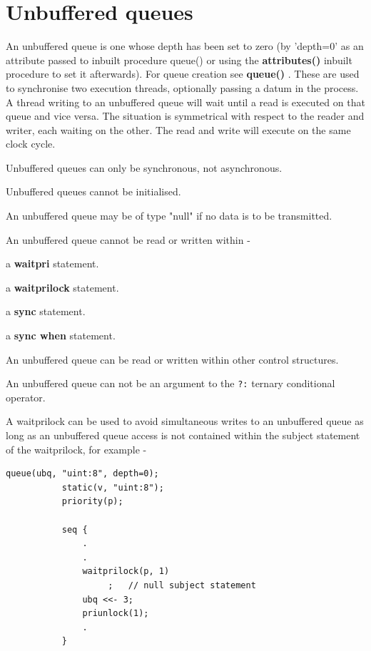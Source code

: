     \section{Unbuffered queues}\label{sec:unbufferedqueues}
     
        An unbuffered queue is one whose depth has been set to zero (by 'depth=0'
        as an attribute passed to inbuilt procedure queue() or using the {\bf
        attributes()}  inbuilt procedure to set it
        afterwards). For queue creation see {\bf queue()}
        . These are used to synchronise two execution
        threads, optionally passing a datum in the process. A thread writing to
        an unbuffered queue will wait until a read is executed on that queue and
        vice versa. The situation is symmetrical with respect to the reader and
        writer, each waiting on the other. The read and write will execute on the
        same clock cycle.
        
        Unbuffered queues can only be synchronous, not asynchronous.
        
        Unbuffered queues cannot be initialised.
        
        An unbuffered queue may be of type "null" if no data is to be transmitted.

        An unbuffered queue cannot be read or written within -
        \blist
        \item   a {\bf waitpri} statement.
        \item   a {\bf waitprilock} statement.
        \item   a {\bf sync} statement.
        \item   a {\bf sync when} statement.
        \blend
        
        An unbuffered queue can be read or written within other control
        structures.
        
        An unbuffered queue can not be an argument to the \verb'?:' ternary
        conditional operator.
        
        A waitprilock can be used to avoid simultaneous writes to an unbuffered
        queue as long as an unbuffered queue access is not contained within
        the subject statement of the waitprilock, for example -
        
        \begin{lstlisting}[gobble=8, language=threepl]
           queue(ubq, "uint:8", depth=0);
           static(v, "uint:8");
           priority(p);

           seq {
               .
               .
               waitprilock(p, 1)
                    ;   // null subject statement
               ubq <<- 3;
               priunlock(1);
               .
           }
        \end{lstlisting}
        
